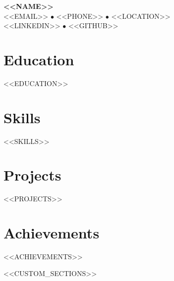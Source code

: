 \documentclass[11pt,a4paper]{article}
\begin{document}
\begin{center}
{\Large\bfseries <<NAME>>}\\[0.2cm]
<<EMAIL>> $\bullet$ <<PHONE>> $\bullet$ <<LOCATION>>\\[0.1cm]
<<LINKEDIN>> $\bullet$ <<GITHUB>>
\end{center}

\vspace{0.4cm}

\section{Education}
<<EDUCATION>>

\section{Skills}
<<SKILLS>>

\section{Projects}
<<PROJECTS>>

\section{Achievements}
\begin{itemize}[leftmargin=*]
<<ACHIEVEMENTS>>
\end{itemize}

<<CUSTOM_SECTIONS>>
\end{document}
